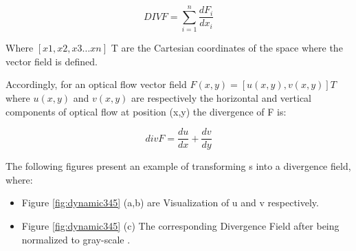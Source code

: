 \documentclass[12pt,fleqn]{book} %
\begin{document}
\begin{dBox}
\begin{equation}
DIVF = \sum_{i=1}^{n}\frac{d F_i}{d x_i}
\end{equation}
\end{dBox}

Where $[x1, x2, x3 … xn]$ T are the Cartesian coordinates of the space where the vector field is defined.\bigskip

Accordingly, for an optical flow vector field $F(x,y) = [u(x,y), v(x,y)]T$ where $u(x,y)$ and $v(x,y)$ are respectively the horizontal and vertical components of optical flow at position (x,y) the divergence of F is:

\begin{dBox}
\begin{equation}
divF = \frac{du}{dx} + \frac{dv}{dy}
\end{equation}
\end{dBox}
\bigskip

The following figures present an example of transforming s into a divergence field, where:

\begin{itemize}
\item Figure \ref{fig:dynamic345} (a,b) are Visualization of u and v respectively. 

\item Figure \ref{fig:dynamic345} (c) The corresponding Divergence Field after being normalized to gray-scale \cite{dynamic3}.

\end{itemize}
\end{document}
